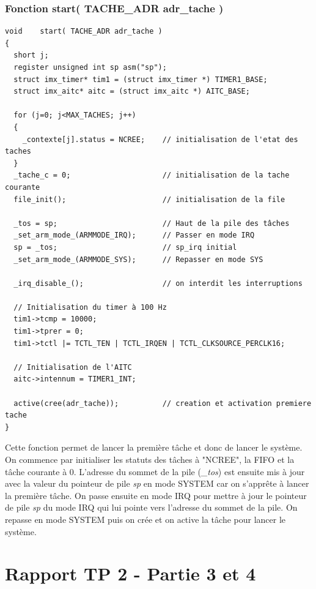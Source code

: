 \documentclass[a4paper,12pt]{report}
\begin{document}
\subsection{Fonction start( TACHE\_ADR adr\_tache )}
\begin{lstlisting}
void	start( TACHE_ADR adr_tache )
{
  short j;
  register unsigned int sp asm("sp");
  struct imx_timer* tim1 = (struct imx_timer *) TIMER1_BASE;
  struct imx_aitc* aitc = (struct imx_aitc *) AITC_BASE;

  for (j=0; j<MAX_TACHES; j++)
  {
    _contexte[j].status = NCREE;    // initialisation de l'etat des taches 
  }
  _tache_c = 0;                     // initialisation de la tache courante 
  file_init();                      // initialisation de la file           

  _tos = sp;                        // Haut de la pile des tâches 
  _set_arm_mode_(ARMMODE_IRQ);      // Passer en mode IRQ 
  sp = _tos;                        // sp_irq initial 
  _set_arm_mode_(ARMMODE_SYS);      // Repasser en mode SYS 

  _irq_disable_();                  // on interdit les interruptions 

  // Initialisation du timer à 100 Hz 
  tim1->tcmp = 10000;
  tim1->tprer = 0;
  tim1->tctl |= TCTL_TEN | TCTL_IRQEN | TCTL_CLKSOURCE_PERCLK16;

  // Initialisation de l'AITC 
  aitc->intennum = TIMER1_INT;

  active(cree(adr_tache));          // creation et activation premiere tache 
}
\end{lstlisting}

Cette fonction permet de lancer la première tâche et donc de lancer le système.
On commence par initialiser les statuts des tâches à "NCREE", la FIFO et la tâche courante à 0. L'adresse du sommet de la pile (\textit{\_tos}) est ensuite mis à jour avec la valeur du pointeur de pile \textit{sp} en mode SYSTEM car on s'apprête à lancer la première tâche. On passe ensuite en mode IRQ pour mettre à jour le pointeur de pile \textit{sp} du mode IRQ qui lui pointe vers l'adresse du sommet de la pile. On repasse en mode SYSTEM puis on crée et on active la tâche pour lancer le système.









\chapter{Rapport TP 2 - Partie 3 et 4}
\end{document}
